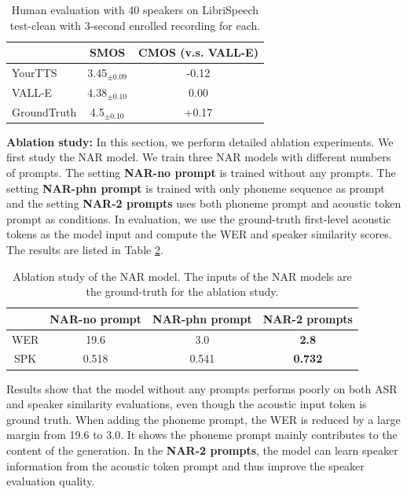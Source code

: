 \documentclass{article}
\theoremstyle{plain}
\theoremstyle{definition}
\theoremstyle{remark}
\newcommand\our{\textsc{VALL-E}}
\begin{document}
\begin{table}[h]
\begin{center}
\caption{Human evaluation with 40 speakers on LibriSpeech test-clean with 3-second enrolled recording for each. \label{exp:libri_spk_human} }
\begin{tabular}{lcc}
\toprule
& SMOS & CMOS (v.s. \our{})   \\
\hline
YourTTS  & 3.45$_{\pm 0.09}$ & -0.12 \\ 
\our{} &  4.38$_{\pm 0.10}$ & 0.00\\ 
GroundTruth &   4.5$_{\pm 0.10}$ & +0.17\\ 
 \bottomrule
\end{tabular}

\end{center}
\end{table}

\textbf{Ablation study:}
In this section, we perform detailed ablation experiments. We first study the NAR model. We train three NAR models with different numbers of prompts. The setting \textbf{NAR-no prompt} is trained without any prompts. The setting \textbf{NAR-phn prompt} is trained with only phoneme sequence as prompt and the setting \textbf{NAR-2 prompts} uses both phoneme prompt and acoustic token prompt as conditions. In evaluation, we use the ground-truth first-level acoustic tokens as the model input and compute the WER and speaker similarity scores. The results are listed in Table \ref{exp:NAR}. 
\begin{table}[h]
\begin{center}
\caption{Ablation study of the NAR model. The inputs of the NAR models are the ground-truth for the ablation study.   }
\begin{tabular}{cccc}
\toprule
& \bf NAR-no prompt & \bf NAR-phn prompt & \bf NAR-2 prompts \\  \hline
WER & 19.6 & 3.0  & \textbf{2.8} \\ \hline
SPK & 0.518 & 0.541  & \textbf{0.732} \\ \hline
\end{tabular}
\label{exp:NAR}
\end{center}
\end{table}
Results show that the model without any prompts performs poorly on both ASR and speaker similarity evaluations, even though the acoustic input token is ground truth. When adding the phoneme  prompt, the WER is reduced by a large margin from 19.6 to 3.0. It shows the phoneme prompt mainly contributes to the content of the generation. In the \textbf{NAR-2 prompts}, the  model can learn speaker information from the acoustic token prompt and thus improve the speaker evaluation quality.
\end{document}
